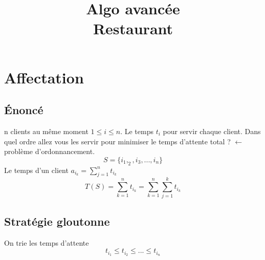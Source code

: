 \documentclass[11pt,a4paper]{article}
\title{Algo avancée \\ Restaurant}
\begin{document}
	\maketitle
	
	\section{Affectation}
	\subsection{Énoncé}
	n clients au même moment $1 \leqslant i \leqslant n$.
	Le temps $t_i$ pour servir chaque client.
	Dans quel ordre allez vous les servir pour minimiser le temps d'attente total ?
	$\leftarrow$ problème d'ordonnancement.
	$$S = \{i_1, _2, i_3, ..., i_n\}$$
	Le temps d'un client $a_{i_k} = \sum_{j=1}^{n} t_{i_k}$
	$$T(S) = \sum_{k=1}^{n} t_{i_k} =  \sum_{k=1}^{n}\sum_{j=1}^{k} t_{i_k}$$
	\subsection{Stratégie gloutonne}
	On trie les temps d'attente $$t_{i_1} \leqslant t_{i_2} \leqslant ... \leqslant t_{i_n}$$
\end{document}
